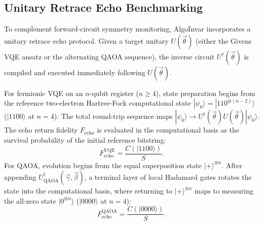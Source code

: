\documentclass[aps,pra,reprint,superscriptaddress,floatfix,nofootinbib]{revtex4-2}
\begin{document}
\subsection{Unitary Retrace Echo Benchmarking}
To complement forward-circuit symmetry monitoring, AlgoInvar incorporates a unitary retrace echo protocol. Given a target unitary $U(\vec{\theta})$ (either the Givens VQE ansatz or the alternating QAOA sequence), the inverse circuit $U^\dagger(\vec{\theta})$ is compiled and executed immediately following $U(\vec{\theta})$.

For fermionic VQE on an $n$-qubit register ($n \ge 4$), state preparation begins from the reference two-electron Hartree-Fock computational state $|\psi_0\rangle = |110^{\otimes (n-2)}\rangle$ ($|1100\rangle$ at $n = 4$). The total round-trip sequence maps $|\psi_0\rangle \to U^\dagger(\vec{\theta}) U(\vec{\theta}) |\psi_0\rangle$. The echo return fidelity $F_{\text{echo}}$ is evaluated in the computational basis as the survival probability of the initial reference bitstring:
\begin{equation}
F_{\text{echo}}^{\text{VQE}} = \frac{C(|1100\rangle)}{S}.
\end{equation}
For QAOA, evolution begins from the equal superposition state $|+\rangle^{\otimes n}$. After appending $U_{\text{QAOA}}^\dagger(\vec{\gamma}, \vec{\beta})$, a terminal layer of local Hadamard gates rotates the state into the computational basis, where returning to $|+\rangle^{\otimes n}$ maps to measuring the all-zero state $|0^{\otimes n}\rangle$ ($|0000\rangle$ at $n = 4$):
\begin{equation}
F_{\text{echo}}^{\text{QAOA}} = \frac{C(|0000\rangle)}{S}.
\end{equation}
\end{document}
